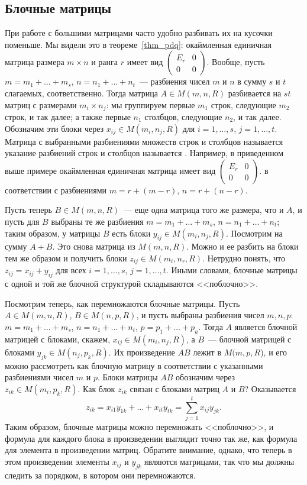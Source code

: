 \subsection{Блочные матрицы}

При работе с большими матрицами часто удобно разбивать их на
кусочки поменьше. Мы видели это в теореме~\ref{thm_pdq}:
окаймленная единичная матрица размера $m\times n$ и ранга $r$
имеет вид
$\begin{pmatrix}
E_r & 0\\ 0 & 0
\end{pmatrix}$.
Вообще, пусть $m = m_1 + \dots + m_s$, $n = n_1 + \dots + n_t$~---
разбиения чисел $m$ и $n$ в сумму $s$ и $t$ слагаемых, соответственно.
Тогда матрица $A\in M(m,n,R)$ разбивается
на $st$ матриц с размерами $m_i\times n_j$: мы группируем
первые $m_1$ строк, следующие $m_2$ строк, и так далее;
а также первые $n_1$ столбцов, следующие $n_2$, и так далее.
Обозначим эти блоки через $x_{ij}\in M(m_i,n_j,R)$ для
$i=1,\dots,s$, $j=1,\dots,t$.
Матрица с выбранными разбиениями множеств строк и столбцов
называется 
указание разбиений строк и столбцов
называется .
Например, в приведенном выше примере окаймленная
единичная матрица имеет вид
$\begin{pmatrix}
E_r & 0\\ 0 & 0
\end{pmatrix}$.
в соответствии с разбиениями $m = r + (m-r)$, $n = r + (n-r)$.

Пусть теперь $B\in M(m,n,R)$~--- еще одна матрица того же размера,
что и $A$, и пусть для $B$ выбраны те же разбиения
$m = m_1 + \dots + m_s$, $n = n_1 + \dots + n_t$; таким образом,
у матрицы $B$ есть блоки $y_{ij}\in M(m_i,n_j,R)$.
Посмотрим на сумму $A+B$. Это снова матрица из $M(m,n,R)$.
Можно и ее разбить на блоки тем же образом и
получить блоки $z_{ij}\in M(m_i,n_r,R)$.
Нетрудно понять, что $z_{ij} = x_{ij} + y_{ij}$ для всех $i=1,\dots,s$,
$j=1,\dots,t$. Иными словами,
блочные матрицы с одной и той же блочной структурой
складываются <<поблочно>>.

Посмотрим теперь, как перемножаются блочные матрицы.
Пусть $A\in M(m,n,R)$, $B\in M(n,p,R)$, и пусть выбраны разбиения
чисел $m,n,p$: $m = m_1 + \dots + m_s$, $n = n_1 + \dots + n_t$,
$p = p_1 + \dots + p_u$.
Тогда $A$ является блочной матрицей с блоками, скажем,
$x_{ij}\in M(m_i,n_j,R)$, а $B$~--- блочной матрицей с блоками
$y_{jk}\in M(n_j,p_k,R)$.
Их произведение $AB$ лежит в $M(m,p,R$), и его можно рассмотреть
как блочную матрицу в соответствии с указанными разбиениями
чисел $m$ и $p$.
Блоки матрицы $AB$ обозначим через $z_{ik}\in M(m_i,p_k,R)$.
Как блок $z_{ik}$ связан с блоками матриц $A$ и $B$?
Оказывается
$$
z_{ik} = x_{i1}y_{1k} + \dots + x_{it}y_{tk}
= \sum_{j=1}^t x_{ij}y_{jk}.
$$
Таким образом, блочные матрицы можно перемножать <<поблочно>>,
и формула для каждого блока в произведении выглядит точно так же,
как формула для элемента в произведении матриц.
Обратите внимание, однако, что теперь в этом произведении
элементы $x_{ij}$ и $y_{jk}$ являются матрицами, так что
мы должны следить за порядком, в котором они перемножаются.

